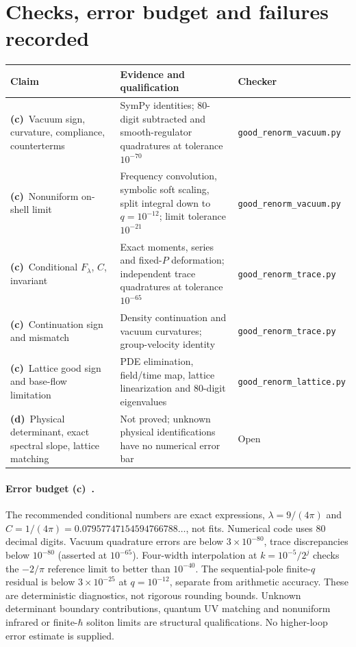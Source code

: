\documentclass[11pt,a4paper]{article}
\newcommand{\C}{\textbf{(c)}\ }
\newcommand{\D}{\textbf{(d)}\ }
\newcommand{\file}[1]{\nolinkurl{#1}}
\newcommand{\vac}{\file{good_renorm_vacuum.py}}
\newcommand{\trc}{\file{good_renorm_trace.py}}
\newcommand{\lat}{\file{good_renorm_lattice.py}}
\begin{document}
\section{Checks, error budget and failures recorded}
\small
\begin{longtable}{@{}L{4.3cm}L{6.3cm}L{3.5cm}@{}}\toprule
Claim & Evidence and qualification & Checker\\\midrule\endhead
\C Vacuum sign, curvature, compliance, counterterms & SymPy identities;
80-digit subtracted and smooth-regulator quadratures at tolerance $10^{-70}$ & \vac\\[4pt]
\C Nonuniform on-shell limit & Frequency convolution, symbolic soft
scaling, split integral down to $q=10^{-12}$; limit tolerance $10^{-21}$ & \vac\\[4pt]
\C Conditional $F_\lambda$, $C$, invariant & Exact moments, series and
fixed-$P$ deformation; independent trace quadratures at tolerance $10^{-65}$ & \trc\\[4pt]
\C Continuation sign and mismatch & Density continuation and vacuum
curvatures; group-velocity identity & \trc\\[4pt]
\C Lattice good sign and base-flow limitation & PDE elimination,
field/time map, lattice linearization and 80-digit eigenvalues & \lat\\[4pt]
\D Physical determinant, exact spectral slope, lattice matching & Not
proved; unknown physical identifications have no numerical error bar & Open\\\bottomrule
\end{longtable}
\normalsize

\paragraph{Error budget \C.}
The recommended conditional numbers are exact expressions,
$\lambda=9/(4\pi)$ and $C=1/(4\pi)=0.07957747154594766788\ldots$,
not fits. Numerical code uses 80 decimal digits. Vacuum quadrature errors
are below $3\times10^{-80}$, trace discrepancies below $10^{-80}$
(asserted at $10^{-65}$). Four-width interpolation at $k=10^{-5}/2^j$
checks the $-2/\pi$ reference limit to better than $10^{-40}$.
The sequential-pole finite-$q$ residual is below $3\times10^{-25}$ at
$q=10^{-12}$, separate from arithmetic accuracy. These are deterministic
diagnostics, not rigorous rounding bounds. Unknown determinant boundary
contributions, quantum UV matching and nonuniform infrared or
finite-$\hbar$ soliton limits are structural qualifications. No
higher-loop error estimate is supplied.
\end{document}

